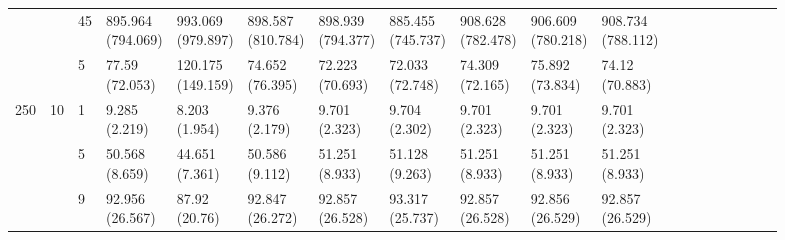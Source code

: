 \documentclass[12pt,a4paper]{article}
\begin{document}
\begin{landscape}
\begin{longtable}{lllllllllllrrrrrrrr}
 &  & 45 & \makecell{895.964 \\ (794.069)} & \makecell{993.069 \\ (979.897)} & \makecell{898.587 \\ (810.784)} & \makecell{898.939 \\ (794.377)} & \makecell{885.455 \\ (745.737)} & \makecell{908.628 \\ (782.478)} & \makecell{906.609 \\ (780.218)} & \makecell{908.734 \\ (788.112)} \\
 &  & 5 & \makecell{77.59 \\ (72.053)} & \makecell{120.175 \\ (149.159)} & \makecell{74.652 \\ (76.395)} & \makecell{72.223 \\ (70.693)} & \makecell{72.033 \\ (72.748)} & \makecell{74.309 \\ (72.165)} & \makecell{75.892 \\ (73.834)} & \makecell{74.12 \\ (70.883)} \\
\cline{1-19} \cline{2-19}
\multirow[t]{9}{*}{250} & \multirow[t]{3}{*}{10} & 1 & \makecell{9.285 \\ (2.219)} & \makecell{8.203 \\ (1.954)} & \makecell{9.376 \\ (2.179)} & \makecell{9.701 \\ (2.323)} & \makecell{9.704 \\ (2.302)} & \makecell{9.701 \\ (2.323)} & \makecell{9.701 \\ (2.323)} & \makecell{9.701 \\ (2.323)} \\
 &  & 5 & \makecell{50.568 \\ (8.659)} & \makecell{44.651 \\ (7.361)} & \makecell{50.586 \\ (9.112)} & \makecell{51.251 \\ (8.933)} & \makecell{51.128 \\ (9.263)} & \makecell{51.251 \\ (8.933)} & \makecell{51.251 \\ (8.933)} & \makecell{51.251 \\ (8.933)} \\
 &  & 9 & \makecell{92.956 \\ (26.567)} & \makecell{87.92 \\ (20.76)} & \makecell{92.847 \\ (26.272)} & \makecell{92.857 \\ (26.528)} & \makecell{93.317 \\ (25.737)} & \makecell{92.857 \\ (26.528)} & \makecell{92.856 \\ (26.529)} & \makecell{92.857 \\ (26.529)} \\

\end{longtable}
\end{landscape}
\end{document}
